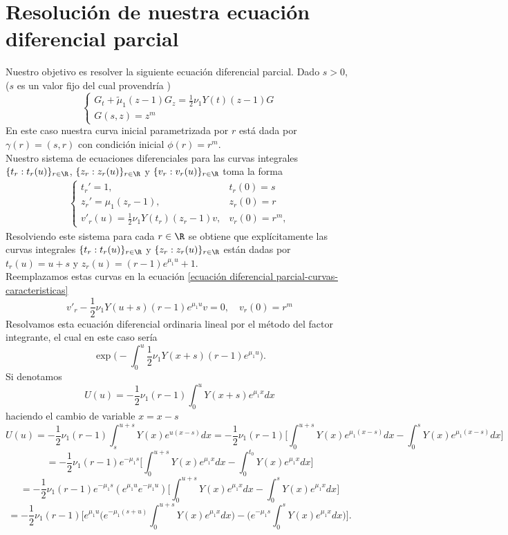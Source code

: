 \section{Resolución de nuestra ecuación diferencial parcial}
Nuestro objetivo es resolver la siguiente ecuación diferencial parcial. Dado $s>0$, ($s$ es un valor fijo del cual provendría )
$$\begin{cases}
    G_t+\tilde{\mu}_1(z-1)G_z=\frac{1}{2}\nu_1Y(t)(z-1)G\\G(s,z)=z^m
\end{cases}$$
En este caso nuestra curva inicial parametrizada por $r$ está dada por $\gamma(r)=(s,r)$ con condición inicial $\phi(r)=r^m$.\\
Nuestro sistema de ecuaciones diferenciales para las curvas integrales $\{t_r:t_r(u)\}_{r\in\R}$, $\{z_r:z_r(u)\}_{r\in\R}$ y $\{v_r:v_r(u)\}_{r\in\R}$ toma la forma
\begin{eqnarray}
    \begin{cases}
    \label{ecuación diferencial parcial-curvas-caracteristicas}
        t_r'=1, & t_r(0)=s\\
        z_r'=\mu_1(z_r-1), & z_r(0)=r\\
        v'_r(u)=\frac{1}{2}\nu_1Y(t_r)(z_r-1)v, & v_r(0)=r^m,
    \end{cases}
\end{eqnarray}
Resolviendo este sistema para cada $r\in\R$ se obtiene que explícitamente las curvas integrales $\{t_r:t_r(u)\}_{r\in\R}$ y $\{z_r:z_r(u)\}_{r\in\R}$ están dadas por $t_r(u)=u+s$ y $z_r(u)=(r-1)e^{\mu_1 u}+1$.\\
Reemplazamos estas curvas en la ecuación \ref{ecuación diferencial parcial-curvas-caracteristicas}
$$v'_r-\frac{1}{2}\nu_1Y(u+s)(r-1)e^{\mu_1 u}v= 0, \quad v_r(0)=r^m$$
Resolvamos esta ecuación diferencial ordinaria lineal por el método del factor integrante, el cual en  este caso sería
$$\exp\bigg(-\int_0^u \frac{1}{2}\nu_1Y(x+s)(r-1)e^{\mu_1 u}\bigg).$$
Si denotamos
$$U(u)=-\frac{1}{2}\nu_1(r-1)\int_0^u Y(x+s)e^{\mu_1x} dx $$
haciendo el cambio de variable $x=x-s$
$$U(u)=-\frac{1}{2}\nu_1(r-1)\int_{s}^{u+s}Y(x)e^{u(x-s)}dx
=-\frac{1}{2}\nu_1(r-1)\bigg[\int_0^{u+s}Y(x)e^{\mu_1 (x-s)}dx-\int_0^{s}Y(x)e^{\mu_1 (x-s)}dx\bigg]$$
$$=-\frac{1}{2}\nu_1(r-1)e^{-\mu_1 s}\bigg[\int_0^{u+s}Y(x)e^{\mu_1 x}dx-\int_0^{t_0}Y(x)e^{\mu_1 x}dx\bigg]$$
$$=-\frac{1}{2}\nu_1(r-1)e^{-\mu_1 s}(e^{\mu_1 u}e^{-\mu_1 u})\bigg[\int_0^{u+s}Y(x)e^{\mu_1 x}dx-\int_0^{s}Y(x)e^{\mu_1 x}dx\bigg]$$
$$=-\frac{1}{2}\nu_1(r-1)\bigg[e^{\mu_1 u}\bigg(e^{-\mu_1 (s+u)}\int_0^{u+s}Y(x)e^{\mu_1 x}dx\bigg)-\bigg(e^{-\mu_1 s}\int_0^{s}Y(x)e^{\mu_1 x}dx\bigg)\bigg].$$
